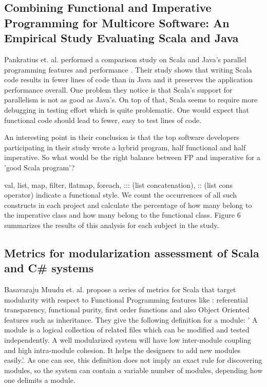\documentclass{article}
\begin{document}
\subsection {Combining Functional and Imperative Programming for Multicore Software: An Empirical Study Evaluating Scala and Java}
Pankratius et. al. performed a comparison study on Scala and Java's parallel programming features and performance \cite{Pankratius_combiningfunctional}. Their study shows that writing Scala code results in fewer lines of code than in Java and it preserves the application performance overall. One problem they notice is that Scala's support for parallelism is not as good as Java's. On top of that, Scala seems to require more debugging in testing effort which is quite problematic. One would expect that functional code should lead to fewer, easy to test lines of code. \par

An interesting point in their conclusion is that the top software developers participating in their study wrote a hybrid program, half functional and half imperative. So what would be the right balance between FP and imperative for a 'good Scala program'? \par

val, list, map, filter, flatmap, foreach, ::: (list concatenation), :: (list cons operator) indicate a functional style. We count the occurrences of all such constructs in each project and calculate the percentage of how many belong to the imperative class and how many belong to the functional class. Figure 6 summarizes the results of this analysis for each subject in the study. \cite{Pankratius_combiningfunctional}

\subsection{ Metrics for modularization assessment of Scala and C{\#} systems }
Basavaraju Muudu et. al. \cite{DBLP:conf/icse/MudduABP13} propose a series of metrics for Scala that target modularity with respect to Functional Programming features like : referential transparency, functional purity, first order functions and also Object Oriented features such as inheritance. They give the following definition for a module: ' A module is a logical collection of related files which can be modified and tested independently. A well modularized system will have low inter-module coupling and high intra-module cohesion. It helps the designers to add new modules easily.'\cite{DBLP:conf/icse/MudduABP13}. As one can see, this definition does not imply an exact rule for discovering  modules, so the system can contain a variable number of modules, depending how one delimits a module. \par
\end{document}
